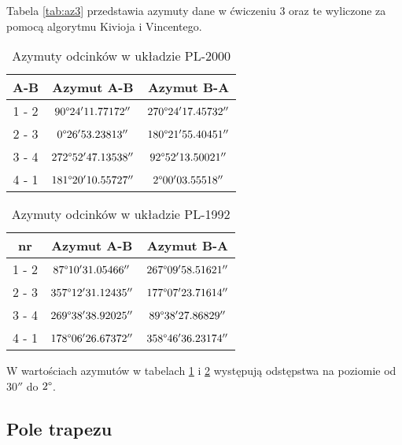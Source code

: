 \documentclass[fleqn,10pt,a4paper]{article}
\begin{document}
Tabela \ref{tab:az3} przedstawia azymuty dane w ćwiczeniu 3 oraz te wyliczone za pomocą algorytmu Kivioja i Vincentego.

\begin{table}[!ht]
  \centering
  \begin{tabular}{|c|c|c|}
    \hline
    A-B    & Azymut A-B               & Azymut B-A      \\
    \hline
    1 - 2 & $ 90\degree 24' 11.77172''$  & $ 270\degree 24'17.45732''$  \\
    2 - 3 & $  0\degree 26' 53.23813''$  & $ 180\degree 21'55.40451''$  \\
    3 - 4 & $ 272\degree 52'47.13538''$ & $  92\degree 52' 13.50021''$  \\
    4 - 1 & $181\degree 20'10.55727''$ & $   2\degree 00' 03.55518''$  \\
    \hline
  \end{tabular}
  \caption{Azymuty odcinków w układzie PL-2000}
  \label{tab:az2000}
\end{table}

\begin{table}[!ht]
  \centering
  \begin{tabular}{|c|c|c|}
    \hline
    nr    & Azymut A-B               & Azymut B-A  \\
    \hline
    1 - 2 & $87\degree 10' 31.05466''$  & $267\degree 09'58.51621'' $ \\
    2 - 3 & $357\degree 12'31.12435''$  & $177\degree 07' 23.71614''$ \\
    3 - 4 & $269\degree 38'38.92025''$ & $89\degree 38' 27.86829'' $ \\
    4 - 1 & $178\degree 06' 26.67372''$ & $358\degree 46'36.23174''$  \\
    \hline
  \end{tabular}
  \caption{Azymuty odcinków w układzie PL-1992}
  \label{tab:az1992}
\end{table}

W wartościach azymutów w tabelach \ref{tab:az2000} i \ref{tab:az1992} występują odstępstwa na poziomie od 
$30''$ do $2 \degree$.


\subsection{Pole trapezu}
\end{document}
